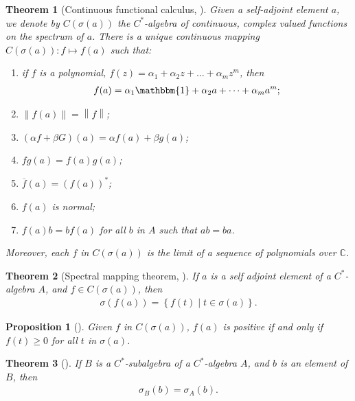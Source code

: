 \documentclass[11pt,a4paper]{report}
\theoremstyle{plain}
\newtheorem*{thm*}{Theorem}
\newtheorem{prop}{Proposition}
\theoremstyle{definition}
\newcommand{\1}{\mathbbm{1}}
\newcommand{\C}{\mathbb{C}}
\newcommand{\spec}[1]{\sigma(#1)}
\begin{document}
\begin{thm*}[Continuous functional calculus, {\cite[4.1.3]{kadison83}}]
	Given a self-adjoint element $a$, we denote by $C(\spec a)$ the $C^\ast$-algebra of continuous, 
	complex valued functions on the spectrum of $a$. There is a unique continuous mapping $C(\spec a):f
	\mapsto f(a)$ such that:
	\begin{enumerate}
		\item	if $f$ is a polynomial, $f(z)=\alpha_1+\alpha_2z+\dots+\alpha_mz^m$, then 
				\begin{align*}
					f(a)=\alpha_1\1+\alpha_2a+\dots+\alpha_ma^m;
				\end{align*}
		\item	$\left\|f(a)\right\| = \left\|f\right\|$;
		\item	$(\alpha f+\beta G)(a) = \alpha f(a) + \beta g(a)$;
		\item	$fg(a)=f(a)g(a)$;
		\item	$\overline{f}(a) = (f(a))^\ast$;
		\item	$f(a)$ is normal;
		\item	$f(a)b=bf(a)$ for all $b$ in $A$ such that $ab=ba$.
	\end{enumerate}
	Moreover, each $f$ in $C(\spec a)$ is the limit of a sequence of polynomials over $\C$.
\end{thm*}

\begin{thm*}[Spectral mapping theorem, {\cite[4.1.6]{kadison83}}]
	If $a$ is a self adjoint element of a $C^\ast$-algebra $A$, and $f\in C(\spec a)$, then
	\begin{align*}
		\spec{f(a)} = \left\{f(t) \mid t \in \spec a\right\}.
	\end{align*}
\end{thm*}

\begin{prop}[{\cite[4.2.3(i)]{kadison83}}]\label{prop:423}
	Given $f$ in $C(\spec a)$, $f(a)$ is positive  if and only if $f(t)\geq0$ for all $t$ in $\spec a$.
\end{prop}

\begin{thm*}[{\cite[4.1.5]{kadison83}}]
	If $B$ is a $C^\ast$-subalgebra of a $C^\ast$-algebra $A$, and $b$ is an element of $B$, then 
	\begin{align*}
		\sigma_B(b) =\sigma_A(b).
	\end{align*}
\end{thm*}
\end{document}
